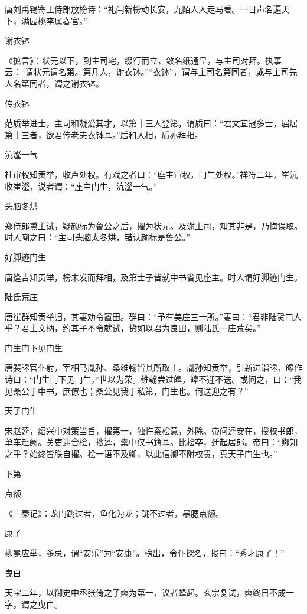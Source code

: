 \documentclass[a4paper,12pt,UTF8,twoside]{ctexbook}
\begin{document}
    唐刘禹锡寄王侍郎放榜诗：“礼闱新榜动长安，九陌人人走马看。一日声名遍天下，满园桃李属春官。”
    
    谢衣钵
    
    《摭言》：状元以下，到主司宅，缀行而立，敛名纸通呈，与主司对拜。执事云：“请状元请名第。第几人，谢衣钵。”“衣钵”，谓与主司名第同者，或与主司先人名第同者，谓之谢衣钵。
    
    传衣钵
    
    范质举进士，主司和凝爱其才，以第十三人登第，谓质曰：“君文宜冠多士，屈居第十三者，欲君传老夫衣钵耳。”后和入相，质亦拜相。
    
    沆瀣一气
    
    杜审权知贡举，收卢处权。有戏之者曰：“座主审权，门生处权。”祥符二年，崔沆收崔瀣，说者谓：“座主门生，沆瀣一气。”
    
    头脑冬烘
    
    郑侍郎熏主试，疑颜标为鲁公之后，擢为状元。及谢主司，知其非是，乃悔误取。时人嘲之曰：“主司头脑太冬烘，错认颜标是鲁公。”
    
    好脚迹门生
    
    唐逢吉知贡举，榜未发而拜相，及第士子皆就中书省见座主。时人谓好脚迹门生。
    
    陆氏荒庄
    
    唐崔群知贡举归，其妻劝令置田。群曰：“予有美庄三十所。”妻曰：“君非陆贽门人乎？君主文柄，约其子不令就试，贽如以君为良田，则陆氏一庄荒矣。”
    
    门生门下见门生
    
    唐裴皞官仆射，宰相马胤孙、桑维翰皆其所取士。胤孙知贡举，引新进诣皞，皞作诗曰：“门生门下见门生。”世以为荣。维翰尝过皞，皞不迎不送。或问之，曰：“我见桑公于中书，庶僚也；桑公见我于私第，门生也。何送迎之有？”
    
    天子门生
    
    宋赵逵，绍兴中对策当旨，擢第一，独忤秦桧意，外除。帝问逵安在，授校书郎，单车赴阙。关吏迎合桧，搜逵，橐中仅书籍耳。比桧卒，迁起居郎。帝曰：“卿知之乎？始终皆朕自擢。桧一语不及卿，以此信卿不附权贵，真天子门生也。”
    
    下第
    
    点额
    
    《三秦记》：龙门跳过者，鱼化为龙；跳不过者，暴腮点额。
    
    康了
    
    柳冕应举，多忌，谓“安乐”为“安康”。榜出，令仆探名，报曰：“秀才康了！”
    
    曳白
    
    天宝二年，以御史中丞张倚之子奭为第一，议者蜂起。玄宗复试，奭终日不成一字，谓之曳白。
    
\end{document}
